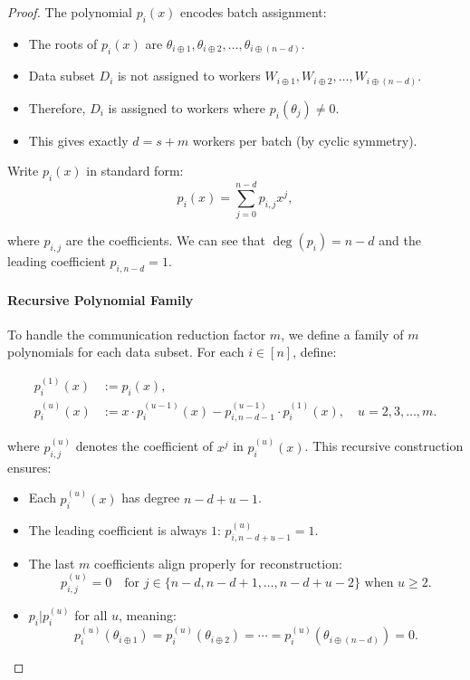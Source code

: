 \documentclass{report}
\theoremstyle{definition}
\begin{document}
\begin{proof}
    \noindent The polynomial $p_i(x)$ encodes batch assignment:
    \begin{itemize}
        \item The roots of $p_i(x)$ are $\theta_{i \oplus 1}, \theta_{i \oplus 2}, \ldots, \theta_{i \oplus (n-d)}$.
        \item Data subset $D_i$ is not assigned to workers $W_{i \oplus 1}, W_{i \oplus 2}, \ldots, W_{i \oplus (n-d)}$.
        \item Therefore, $D_i$ is assigned to workers where $p_i(\theta_j) \neq 0$.
        \item This gives exactly $d = s + m$ workers per batch (by cyclic symmetry).
    \end{itemize}

    \noindent Write $p_i(x)$ in standard form:
    \begin{equation}
        p_i(x) = \sum_{j=0}^{n-d} p_{i,j} x^j,
    \end{equation}

    \noindent where $p_{i,j}$ are the coefficients. We can see that $\deg(p_i) = n - d$ and the leading coefficient $p_{i, n-d} = 1$.

    \paragraph{Recursive Polynomial Family}
    To handle the communication reduction factor $m$, we define a family of $m$ polynomials for each data subset. For each $i \in [n]$, define:

    \begin{equation}
        \begin{aligned}
            p_i^{(1)}(x) &:= p_i(x), \\
            p_i^{(u)}(x) &:= x \cdot p_i^{(u-1)}(x) - p_{i, n-d-1}^{(u-1)} \cdot p_i^{(1)}(x), \quad u = 2, 3, \ldots, m.
        \end{aligned}
    \end{equation}

    \noindent where $p_{i,j}^{(u)}$ denotes the coefficient of $x^j$ in $p_i^{(u)}(x)$. This recursive construction ensures:
    \begin{itemize}
        \item Each $p_i^{(u)}(x)$ has degree $n - d + u - 1$.
        \item The leading coefficient is always $1$: $p_{i, n-d+u-1}^{(u)} = 1$.
        \item The last $m$ coefficients align properly for reconstruction:
        $$p_{i,j}^{(u)} = 0 \quad \text{for } j \in \{n-d, n-d+1, \ldots, n-d+u-2\} \text{ when } u \geq 2.$$
        \item $p_i | p_i^{(u)}$ for all $u$, meaning:
        $$p_i^{(u)}(\theta_{i \oplus 1}) = p_i^{(u)}(\theta_{i \oplus 2}) = \cdots = p_i^{(u)}(\theta_{i \oplus (n-d)}) = 0.$$
    \end{itemize}


\end{proof}
\end{document}
